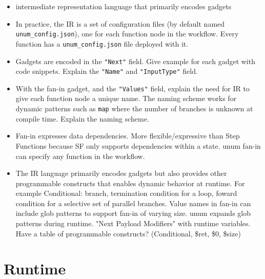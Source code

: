 \begin{itemize}

    \item intermediate representation language that primarily encodes gadgets

    \item In practice, the \name{} IR is a set of configuration files (by default named
    \texttt{unum\_config.json}), one for each function node in the workflow.
    Every function has a \texttt{unum\_config.json} file deployed with it.

    \item Gadgets are encoded in the \texttt{"Next"} field. Give example for
    each gadget with code snippets. Explain the \texttt{"Name"} and
    \texttt{"InputType"} field.

    \item With the fan-in gadget, and the \texttt{"Values"} field, explain the
    need for IR to give each function node a unique name. The naming scheme
    works for dynamic patterns such as \texttt{map} where the number of
    branches is unknown at compile time. Explain the naming scheme.

    \item Fan-in expresses data dependencies. More flexible/expressive than
    Step Functions because SF only supports dependencies within a state. unum
    fan-in can specify any function in the workflow.

    \item The IR language primarily encodes gadgets but also provides other programmable
    constructs that enables dynamic behavior at runtime. For example
    Conditional: branch, termination condition for a loop, foward condition
    for a selective set of parallel branches. Value names in fan-in can
    include glob patterns to support fan-in of varying size. unum expands glob
    patterns during runtime. "Next Payload Modifiers" with runtime variables.
    Have a table of programmable constructs? (Conditional, \$ret, \$0, \$size)

\end{itemize}




\section{Runtime}

